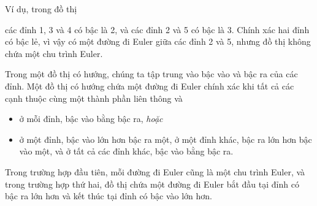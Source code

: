 \begin{samepage}
Ví dụ, trong đồ thị
\begin{center}
\end{center}
\end{samepage}
các đỉnh 1, 3 và 4 có bậc là 2,
và các đỉnh 2 và 5 có bậc là 3.
Chính xác hai đỉnh có bậc lẻ,
vì vậy có một đường đi Euler giữa các đỉnh 2 và 5,
nhưng đồ thị không chứa một chu trình Euler.

Trong một đồ thị có hướng,
chúng ta tập trung vào bậc vào và bậc ra
của các đỉnh.
Một đồ thị có hướng chứa một đường đi Euler
chính xác khi tất cả các cạnh thuộc cùng một
thành phần liên thông và
\begin{itemize}
\item ở mỗi đỉnh, bậc vào bằng bậc ra, \emph{hoặc}
\item ở một đỉnh, bậc vào lớn hơn bậc ra một,
ở một đỉnh khác, bậc ra lớn hơn bậc vào một,
và ở tất cả các đỉnh khác, bậc vào bằng bậc ra.
\end{itemize}

Trong trường hợp đầu tiên, mỗi đường đi Euler
cũng là một chu trình Euler,
và trong trường hợp thứ hai, đồ thị chứa một đường đi Euler
bắt đầu tại đỉnh có bậc ra lớn hơn
và kết thúc tại đỉnh có bậc vào lớn hơn.

